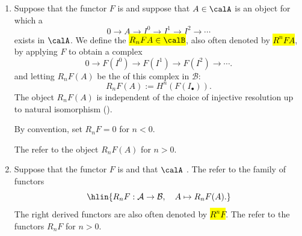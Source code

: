 \begin{definition}
\begin{enumerate}
    \item Suppose that the functor $F$ is  and suppose that $A \in \calA$ is an object for which a 
    $$0 \to A \to I^0 \to I^1 \to I^2 \to \cdots$$
    exists in $\calA$. 
    We define the  \hl{$R_n F A \in \calB$}, also often denoted by \hl{$R^n FA$}, by applying $F$ to obtain a complex
    $$0 \to F(I^0) \to F(I^1) \to F(I^2) \to \cdots.$$
    and letting $R_n F(A)$ be the  of this complex in $\mathcal{B}$:
    $$R_n F(A) := H^n(F(I_\bullet)).$$
    The object $R_n F(A)$ is independent of the choice of injective resolution up to natural isomorphism (). 

    By convention, set $R_n F = 0$ for $n < 0$.

    The  refer to the object $R_n F(A)$ for $n > 0$. 

    \item  Suppose that the functor $F$ is  and that $\calA$ . The  refer to the family of functors
    $$\hlin{R_n F : \mathcal{A} \to \mathcal{B}, \quad A \mapsto R_n F(A).}$$
    The right derived functors are also often denoted by \hl{$R^n F$}.
    The  refer to the functors $R_n F$ for $n > 0$. 
\end{enumerate}
\end{definition}